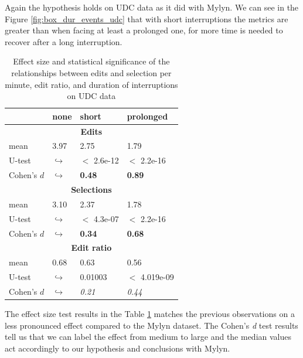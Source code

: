 \documentclass[times]{smrauth}
\begin{document}
Again the hypothesis holds on UDC data as it did with Mylyn. We can see in the Figure \ref{fig:box_dur_events_udc} that with short interruptions the metrics are greater than when facing at least a prolonged one, for more time is needed to recover after a long interruption. 
\begin{table}[ht!]
\tiny
\renewcommand{\arraystretch}{1.3}
\caption{Effect size and statistical significance of the relationships between edits and selection per minute, edit ratio, and duration of interruptions on UDC data} %
\label{tbl:p_value2_udc}
\centering
\begin{tabular}{l | p{0.7cm} | p{1.9cm} | p{1.9cm} } 
   & none & short &  prolonged  \\  
  \hline
  \multicolumn{4}{c}{\textbf{Edits}} \\
  \hline
  mean & 3.97 &	2.75 & 1.79 \\ 
   \cline{3-4} 
  U-test & $\hookrightarrow$ &  $<$ 2.6e-12 & $<$ 2.2e-16  \\

  \cline{3-4} 
  Cohen's $d$ & $\hookrightarrow$	& \textbf{0.48} & \textbf{0.89}   \\
  \hline
  
  
  \multicolumn{4}{c}{\textbf{Selections}} \\
  \hline 
  mean & 3.10 &	2.37 & 1.78 \\ 
   \cline{3-4} 
  U-test & $\hookrightarrow$ & $<$ 4.3e-07& $<$ 2.2e-16  \\
  
  \cline{3-4} 
  Cohen's $d$ & $\hookrightarrow$	& \textbf{0.34} & \textbf{0.68}  \\  
  \hline
  \multicolumn{4}{c}{\textbf{Edit ratio}} \\
  \hline 
  mean & 0.68 & 0.63 & 0.56\\ 
   \cline{3-4} 
  U-test & $\hookrightarrow$ & 0.01003 & $<$ 4.019e-09  \\
  \cline{3-4} 
  Cohen's $d$ & $\hookrightarrow$ & \textit{0.21} & \textit{0.44}\\
\hline

\end{tabular}
\end{table}
The effect size test results in the Table \ref{tbl:p_value2_udc} matches the previous observations on a less pronounced effect compared to the Mylyn dataset. The Cohen's \textit{d} test results tell us that we can label the effect from medium to large and the median values act accordingly to our hypothesis and conclusions with Mylyn.
\end{document}
